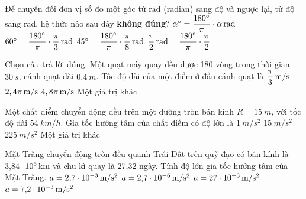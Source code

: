 \begin{ex}
	Để chuyển đổi đơn vị số đo một góc từ $\si{\radian}$ (radian) sang độ và ngược lại, từ độ sang rad, hệ thức nào sau đây \textbf{không đúng}?
	\choice
	{$\xsi{\alpha}{\degree}=\dfrac{\SI{180}{\degree}}{\pi}\cdot\xsi{\alpha}{\radian}$}
	{$\SI{60}{\degree}=\dfrac{\SI{180}{\degree}}{\pi}\cdot\xsi{\dfrac{\pi}{3}}{\radian}$}
	{\True $\SI{45}{\degree}=\dfrac{\SI{180}{\degree}}{\pi}\cdot\xsi{\dfrac{\pi}{8}}{\radian}$}
	{$\xsi{\dfrac{\pi}{2}}{\radian}=\dfrac{\SI{180}{\degree}}{\pi}\cdot\dfrac{\pi}{2}$}
\end{ex}
\begin{ex}
Chọn câu trả lời đúng. Một quạt máy quay đều được 180 vòng trong thời gian $\SI{30}{s}$, cánh quạt dài $\SI{0,4}{m}$. Tốc độ dài của một điểm ở đầu cánh quạt là 	
	\choice
	{$\xsi{\dfrac{\pi}{3}}{m/s}$}
	{$\xsi{2,4\pi}{m/s}$}
	{\True $\xsi{4,8\pi}{m/s}$}
	{Một giá trị khác}
\end{ex}
\begin{ex}
Một chất điểm chuyển động đều trên một đường tròn bán kính $R = \SI{15}{m}$, với tốc độ dài $\SI{54}{km/h}$. Gia tốc hướng tâm của chất điểm có độ lớn là 	
	\choice
	{$\SI{1}{m/s^2}$}
	{\True $\SI{15}{m/s^2}$}
	{$\SI{225}{m/s^2}$}
	{Một giá trị khác}
\end{ex}
\begin{ex}
	Mặt Trăng chuyển động tròn đều quanh Trái Đất trên quỹ đạo có bán kính là 3,84 $\cdot \xsi{10^5}{km}$ và chu kì quay là 27,32 ngày. Tính độ lớn gia tốc hướng tâm của Mặt Trăng.
	\choice
	{\True $a = \text{2,7} \xsi{\cdot 10^{-3}}{m/s^2}$}
	{$a = \text{2,7} \xsi{\cdot 10^{-6}}{m/s^2}$}
	{$a = \xsi{27 \cdot 10^{-3}}{m/s^2}$}
	{$a = \text{7,2} \xsi{\cdot 10^{-3}}{m/s^2}$}
\end{ex}

